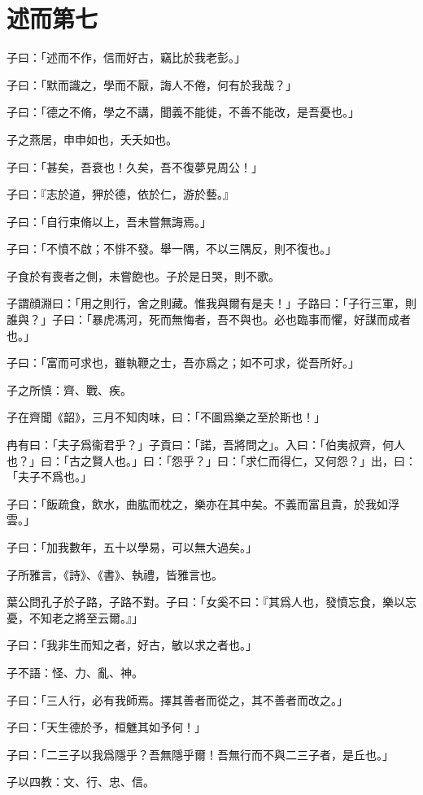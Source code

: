 \section[述而第七]{述而第七}

子曰：「述而不作，信而好古，竊比於我老彭。」

子曰：「默而識之，學而不厭，誨人不倦，何有於我哉？」

子曰：「德之不脩，學之不講，聞義不能徙，不善不能改，是吾憂也。」

子之燕居，申申如也，夭夭如也。

子曰：「甚矣，吾衰也！久矣，吾不復夢見周公！」

子曰：『志於道，狎於德，依於仁，游於藝。』

子曰：「自行束脩以上，吾未嘗無誨焉。」

子曰：「不憤不啟；不悱不發。舉一隅，不以三隅反，則不復也。」

子食於有喪者之側，未嘗飽也。子於是日哭，則不歌。

子謂顔淵曰：「用之則行，舍之則藏。惟我與爾有是夫！」子路曰：「子行三軍，則誰與？」子曰：「暴虎馮河，死而無悔者，吾不與也。必也臨事而懼，好謀而成者也。」

子曰：「富而可求也，雖執鞭之士，吾亦爲之；如不可求，從吾所好。」

子之所慎：齊、戰、疾。

子在齊聞《韶》，三月不知肉味，曰：「不圖爲樂之至於斯也！」

冉有曰：「夫子爲衞君乎？」子貢曰：「諾，吾將問之」。入曰：「伯夷叔齊，何人也？」曰：「古之賢人也。」曰：「怨乎？」曰：「求仁而得仁，又何怨？」出，曰：「夫子不爲也。」

子曰：「飯疏食，飲水，曲肱而枕之，樂亦在其中矣。不義而富且貴，於我如浮雲。」

子曰：「加我數年，五十以學易，可以無大過矣。」

子所雅言，《詩》、《書》、執禮，皆雅言也。

葉公問孔子於子路，子路不對。子曰：「女奚不曰：『其爲人也，發憤忘食，樂以忘憂，不知老之將至云爾。』」

子曰：「我非生而知之者，好古，敏以求之者也。」

子不語：怪、力、亂、神。

子曰：「三人行，必有我師焉。擇其善者而從之，其不善者而改之。」

子曰：「天生德於予，桓魋其如予何！」

子曰：「二三子以我爲隱乎？吾無隱乎爾！吾無行而不與二三子者，是丘也。」

子以四教：文、行、忠、信。


